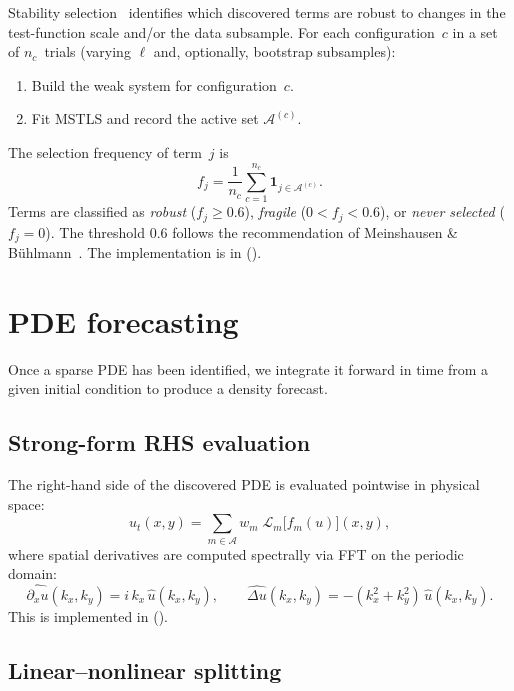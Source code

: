 \documentclass{report}
\theoremstyle{plain}
\theoremstyle{remark}
\numberwithin{equation}{section}              %
\begin{document}
Stability selection~\cite{meinshausen2010stability} identifies which
discovered terms are robust to changes in the test-function scale and/or
the data subsample.  For each configuration~$c$ in a set of $n_c$~trials
(varying $\boldsymbol\ell$ and, optionally, bootstrap subsamples):
\begin{enumerate}[nosep]
\item Build the weak system for configuration~$c$.
\item Fit MSTLS and record the active set $\mathcal{A}^{(c)}$.
\end{enumerate}
The selection frequency of term~$j$ is
\begin{equation}
  f_j = \frac{1}{n_c}\sum_{c=1}^{n_c}\mathbf{1}_{j\in\mathcal{A}^{(c)}}.
  \label{eq:stability_freq}
\end{equation}
Terms are classified as
\emph{robust} ($f_j\ge 0.6$),
\emph{fragile} ($0<f_j<0.6$), or
\emph{never selected} ($f_j=0$).
The threshold 0.6 follows the recommendation of
Meinshausen \& B\"uhlmann~\cite{meinshausen2010stability}.
The implementation is in 
().

%
\section{PDE forecasting}
\label{sec:forecast}

Once a sparse PDE has been identified, we integrate it forward in time
from a given initial condition to produce a density forecast.

\subsection{Strong-form RHS evaluation}
\label{subsec:rhs}

The right-hand side of the discovered PDE is evaluated pointwise in
physical space:
\begin{equation}
  u_t(x,y)
  = \sum_{m\in\mathcal{A}} w_m\;\mathcal{L}_m\!\bigl[f_m(u)\bigr](x,y),
  \label{eq:rhs_eval}
\end{equation}
where spatial derivatives are computed spectrally via FFT on the periodic
domain:
\[
  \widehat{\partial_x u}(k_x,k_y) = i\,k_x\,\hat{u}(k_x,k_y),
  \qquad
  \widehat{\Delta u}(k_x,k_y) = -(k_x^2+k_y^2)\,\hat{u}(k_x,k_y).
\]
This is implemented in  ().

\subsection{Linear--nonlinear splitting}
\label{subsec:splitting}
\end{document}
